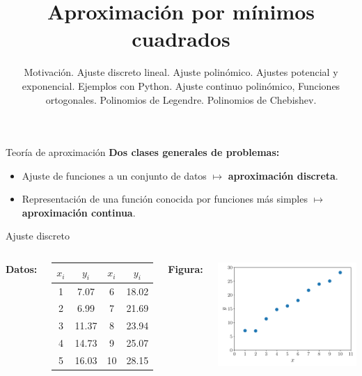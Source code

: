 \documentclass[9pt, aspectratio=169]{beamer}
\title{Aproximación por mínimos cuadrados}
\subtitle{Motivación. Ajuste discreto lineal. Ajuste polinómico. Ajustes potencial y exponencial. Ejemplos con Python. Ajuste continuo polinómico, Funciones ortogonales. Polinomios de Legendre. Polinomios de Chebishev.}
\begin{document}
\maketitle

\begin{frame}{Teoría de aproximación}
	\textbf{Dos clases generales de problemas:}
	\begin{itemize}
		\item Ajuste de funciones a un conjunto de datos $\mapsto$ \textbf{aproximación discreta}.
		\item Representación de una función conocida por funciones más simples $\mapsto$ \textbf{aproximación continua}.
	\end{itemize}
\end{frame}


\begin{frame}[standout]
	\begin{center}
		{\Huge Ajuste discreto}
	\end{center}
\end{frame}

\begin{frame}
	\begin{columns}[t]
		\textbf{Datos:}

		\begin{center}
			\begin{tabular}{cccc}
				\toprule
				$x_i$ & $y_i$ & $x_i$ & $y_i$ \\
				\midrule
				1     & 7.07  & 6     & 18.02 \\
				2     & 6.99  & 7     & 21.69 \\
				3     & 11.37 & 8     & 23.94 \\
				4     & 14.73 & 9     & 25.07 \\
				5     & 16.03 & 10    & 28.15 \\
				\bottomrule
			\end{tabular}
		\end{center}

		\textbf{Figura:}
		\begin{center}
			\includegraphics[scale=0.40]{figs/fig-01.pdf}
		\end{center}
	\end{columns}
\end{frame}
\end{document}
